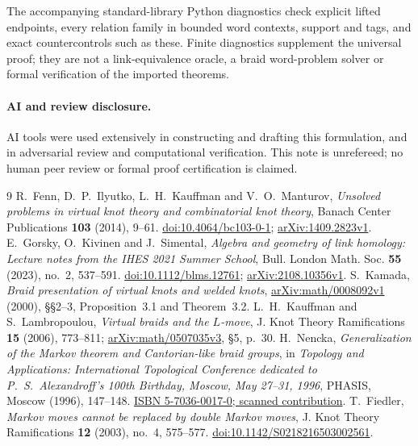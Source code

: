 \documentclass[11pt]{article}
\begin{document}
The accompanying standard-library Python diagnostics check explicit lifted
endpoints, every relation family in bounded word contexts, support and tags,
and exact countercontrols such as these. Finite diagnostics supplement the
universal proof; they are not a link-equivalence oracle, a braid word-problem
solver or formal verification of the imported theorems.

\paragraph{AI and review disclosure.}
AI tools were used extensively in constructing and drafting this formulation,
and in adversarial review and computational verification. This note is
unrefereed; no human peer review or formal proof certification is claimed.

\begingroup
\small
\begin{thebibliography}{9}
 R.~Fenn, D.~P.~Ilyutko, L.~H.~Kauffman and V.~O.~Manturov,
\emph{Unsolved problems in virtual knot theory and combinatorial knot theory},
Banach Center Publications \textbf{103} (2014), 9--61.
\href{https://doi.org/10.4064/bc103-0-1}{doi:10.4064/bc103-0-1};
\href{https://arxiv.org/abs/1409.2823v1}{arXiv:1409.2823v1}.
 E.~Gorsky, O.~Kivinen and J.~Simental,
\emph{Algebra and geometry of link homology: Lecture notes from the IHES 2021 Summer School},
Bull. London Math. Soc. \textbf{55} (2023), no.~2, 537--591.
\href{https://doi.org/10.1112/blms.12761}{doi:10.1112/blms.12761};
\href{https://arxiv.org/abs/2108.10356v1}{arXiv:2108.10356v1}.
 S.~Kamada,
\emph{Braid presentation of virtual knots and welded knots},
\href{https://arxiv.org/abs/math/0008092v1}{arXiv:math/0008092v1} (2000),
\S\S2--3, Proposition~3.1 and Theorem~3.2.
 L.~H.~Kauffman and S.~Lambropoulou,
\emph{Virtual braids and the $L$-move},
J. Knot Theory Ramifications \textbf{15} (2006), 773--811;
\href{https://arxiv.org/abs/math/0507035v3}{arXiv:math/0507035v3}, \S5, p.~30.
 H.~Nencka,
\emph{Generalization of the Markov theorem and Cantorian-like braid groups},
in \emph{Topology and Applications: International Topological Conference
dedicated to P.~S.~Alexandroff's 100th Birthday, Moscow, May 27--31, 1996},
PHASIS, Moscow (1996), 147--148.
\href{https://ru.djvu.online/file/OzKCMNnU4ojPn}{ISBN 5-7036-0017-0; scanned contribution}.
 T.~Fiedler,
\emph{Markov moves cannot be replaced by double Markov moves},
J. Knot Theory Ramifications \textbf{12} (2003), no.~4, 575--577.
\href{https://doi.org/10.1142/S0218216503002561}{doi:10.1142/S0218216503002561}.
\end{thebibliography}
\endgroup
\end{document}
